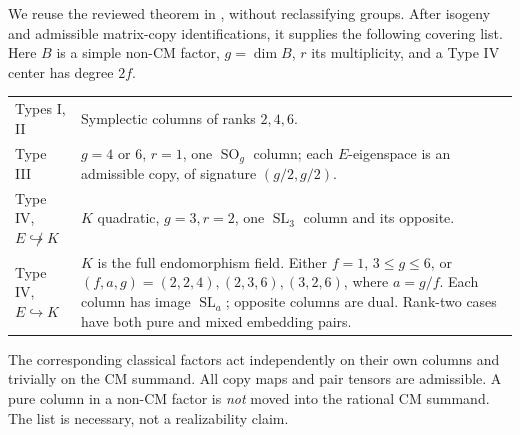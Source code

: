 \documentclass[11pt]{article}
\DeclareMathOperator{\SO}{SO}
\DeclareMathOperator{\SL}{SL}
\theoremstyle{remark}
\begin{document}
We reuse the reviewed theorem in
, without reclassifying groups.
After isogeny and admissible matrix-copy identifications, it supplies the
following covering list. Here $B$ is a simple non-CM factor, $g=\dim B$,
$r$ its multiplicity, and a Type IV center has degree $2f$.
\begin{center}\small
\begin{tabular}{p{}p{}}
Types I, II & Symplectic columns of ranks $2,4,6$.\\
Type III & $g=4$ or $6$, $r=1$, one $\SO_g$ column;
each $E$-eigenspace is an admissible copy, of signature
$(g/2,g/2)$.\\
Type IV, $E\not\hookrightarrow K$ &
$K$ quadratic, $g=3,r=2$, one $\SL_3$ column and its opposite.\\
Type IV, $E\hookrightarrow K$ &
$K$ is the full endomorphism field. Either $f=1$, $3\leq g\leq6$,
or $(f,a,g)=(2,2,4),(2,3,6),(3,2,6)$, where $a=g/f$.
Each column has image $\SL_a$; opposite columns are dual.
Rank-two cases have both pure and mixed embedding pairs.
\end{tabular}
\end{center}
The corresponding classical factors act independently on their own
columns and trivially on the CM summand. All copy maps and pair tensors
are admissible. A pure column in a non-CM factor is \emph{not} moved into
the rational CM summand. The list is necessary, not a realizability claim.
\end{document}
